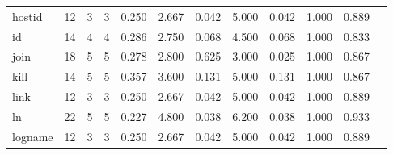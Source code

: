 \begin{longtable}{lp{1.00cm}p{1.00cm}p{1.00cm}p{1.00cm}p{1.00cm}p{1.00cm}p{1.00cm}p{1.00cm}p{1.00cm}p{1.00cm}p{1.00cm}}
hostid    &                           12 &                  3 &                                 3 &                                      0.250 &                                  2.667 &                                        0.042 &                             5.000 &                                   0.042 &                        1.000 &                                        0.889 \\
id        &                           14 &                  4 &                                 4 &                                      0.286 &                                  2.750 &                                        0.068 &                             4.500 &                                   0.068 &                        1.000 &                                        0.833 \\
join      &                           18 &                  5 &                                 5 &                                      0.278 &                                  2.800 &                                        0.625 &                             3.000 &                                   0.025 &                        1.000 &                                        0.867 \\
kill      &                           14 &                  5 &                                 5 &                                      0.357 &                                  3.600 &                                        0.131 &                             5.000 &                                   0.131 &                        1.000 &                                        0.867 \\
link      &                           12 &                  3 &                                 3 &                                      0.250 &                                  2.667 &                                        0.042 &                             5.000 &                                   0.042 &                        1.000 &                                        0.889 \\
ln        &                           22 &                  5 &                                 5 &                                      0.227 &                                  4.800 &                                        0.038 &                             6.200 &                                   0.038 &                        1.000 &                                        0.933 \\
logname   &                           12 &                  3 &                                 3 &                                      0.250 &                                  2.667 &                                        0.042 &                             5.000 &                                   0.042 &                        1.000 &                                        0.889 \\

\end{longtable}
